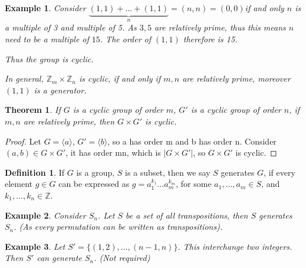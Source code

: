 \documentclass{article}
\theoremstyle{MyNonumberplain}
\theoremstyle{break}
\newtheorem*{proof}{Proof. }
\newcommand{\cyclic}[1]{\langle #1 \rangle}
\theoremstyle{break}
\newtheorem{theorem}{Theorem}[section]
\newtheorem{example}{Example}[section]
\theoremstyle{break}
\theoremstyle{definition}
\theoremstyle{break}
\newtheorem{definition}{Definition}[section]
\begin{document}
\begin{expbox}
\begin{example}
        Consider $\underbrace{(1,1)+...+(1,1)}_{n}=(n,n)=(0,0)$if and only $n$ is a multiple of 3 and multiple of 5. As $3, 5$ are
        relatively prime, thus this means $n$ need to be a multiple of $15$. The order
        of $(1, 1)$ therefore is 15.\bigskip

        Thus the group is cyclic.\bigskip

        In general, $\mathbb{Z}_m \times \mathbb{Z}_n$ is cyclic, if and only if $m,
        n$ are relatively prime, moreover $(1, 1)$ is a generator. 
    \end{example}
\end{expbox}

\begin{thmbox}
    \begin{theorem}
        If $G$ is a cyclic group of order $m$, $G'$ is a cyclic group of order $n$, if
        $m, n$ are relatively prime, then $G \times G'$ is cyclic.
    \end{theorem}
    \begin{prfbox}
        \begin{proof}
            Let $G = \cyclic{a}$, $G' = \cyclic{b}$, so a has order m and b has order n. Consider $(a, b) \in G \times G'$, it
            has order mn, which is $|G \times G'|$, so $G \times G'$ is cyclic.
        \end{proof}
    \end{prfbox}
\end{thmbox}

\begin{defbox}
    \begin{definition}
        If $G$ is a group, $S$ is a subset, then we say $S$ generates $G$, if every
        element $g \in G$ can be expressed as $g = a^{k_1}_1 \ldots a^{k_m}_m$, for
        some $a_1, \ldots, a_m \in S$, and $k_1, \ldots, k_n \in \mathbb{Z}$.
    \end{definition}
\end{defbox}

\begin{expbox}
    \begin{example}
        Consider $S_n$. Let $S$ be a set of all transpositions, then $S$ generates
        $S_n$. (As every permutation can be written as transpositions). 
    \end{example}
\end{expbox}
\begin{expbox}
    \begin{example}
        Let $S' = \{ (1, 2), \ldots, (n - 1, n) \}$. This interchange two integers.
        Then $S'$ can generate $S_n$. (Not required)
    \end{example}
\end{expbox}
\end{document}
